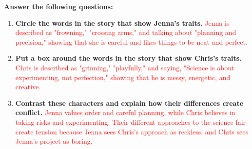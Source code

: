 \documentclass[12pt]{article}
\begin{document}
\begin{tcolorbox}[colframe=black!60, colback=white, 
coltitle=black, colbacktitle=black!15, fonttitle=\bfseries\Large, 
title=Guided Practice: \textit{The Science Fair Showdown}, halign title=center, left=10pt, right=10pt, top=10pt, bottom=15pt]

\textbf{Answer the following questions:}
\begin{enumerate}[itemsep=1em]
    \item \textbf{Circle the words in the story that show Jenna's traits.}  
    \textcolor{red}{Jenna is described as "frowning," "crossing arms," and talking about "planning and precision," showing that she is careful and likes things to be neat and perfect.}  

    \item \textbf{Put a box around the words in the story that show Chris's traits.}  
    \textcolor{red}{Chris is described as "grinning," "playfully," and saying, "Science is about experimenting, not perfection," showing that he is messy, energetic, and creative.}  

    \item \textbf{Contrast these characters and explain how their differences create conflict.}  
    \textcolor{red}{Jenna values order and careful planning, while Chris believes in taking risks and experimenting. Their different approaches to the science fair create tension because Jenna sees Chris’s approach as reckless, and Chris sees Jenna’s project as boring.}
\end{enumerate}
\end{tcolorbox}

\vspace{1em}
\end{document}
